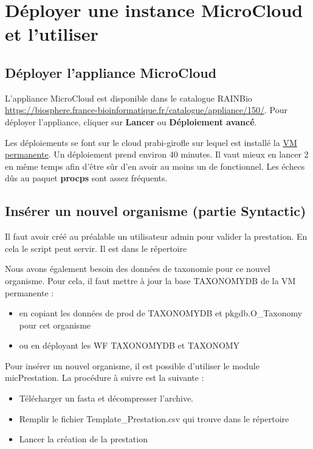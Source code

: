 \chapter{Déployer une instance MicroCloud et l'utiliser}

\section{Déployer l'appliance MicroCloud}

L'appliance MicroCloud est disponible dans le catalogue RAINBio \url{https://biosphere.france-bioinformatique.fr/catalogue/appliance/150/}. Pour déployer l'appliance, cliquer sur \textbf{Lancer} ou \textbf{Déploiement avancé}.

Les déploiements se font sur le cloud prabi-girofle sur lequel est installé la \hyperref[VM permanente]{VM permanente}.
Un déploiement prend environ 40 minutes.
Il vaut mieux en lancer 2 en même temps afin d'être sûr d'en avoir au moins un de fonctionnel.
Les échecs dûs au paquet \textbf{procps} sont assez fréquents.

\section{Insérer un nouvel organisme (partie Syntactic)}
Il faut avoir créé au préalable un utilisateur admin pour valider la prestation. En cela le script  peut servir.
Il est dans le répertoire 
\bigskip

Nous avons également besoin des données de taxonomie pour ce nouvel organisme. Pour cela, il faut mettre à jour la base TAXONOMYDB de la VM permanente :
\begin{itemize}
	\item en copiant les données de prod de TAXONOMYDB et pkgdb.O\_Taxonomy pour cet organisme
	\item ou en déployant les WF TAXONOMYDB et TAXONOMY
\end{itemize}
\bigskip

Pour insérer un nouvel organisme, il est possible d’utiliser le module micPrestation.
La procédure à suivre est la suivante :
\begin{itemize}
	\item Télécharger un fasta et décompresser l'archive.
	\item Remplir le fichier Template\_Prestation.csv qui trouve dans le répertoire 
	\item Lancer la création de la prestation
\end{itemize}

